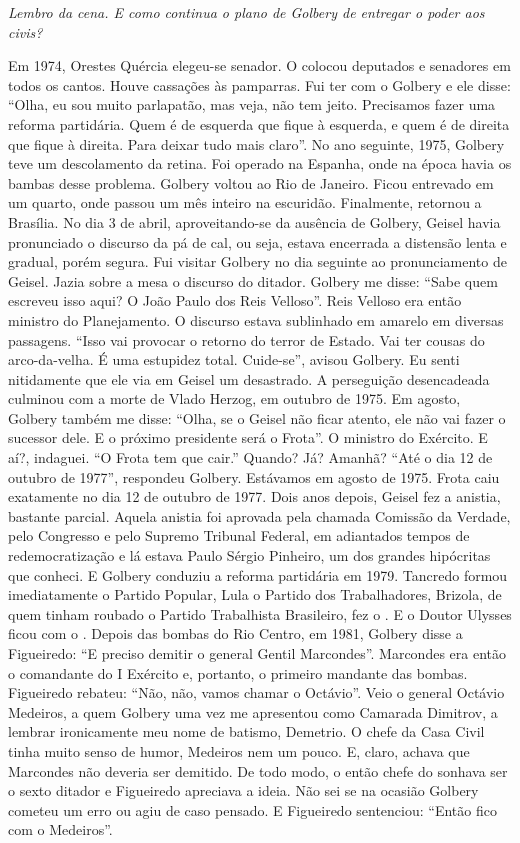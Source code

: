 \itshape
 Lembro da cena. E como continua o plano de Golbery de
entregar o poder aos civis?

\normalfont 
Em 1974, Orestes Quércia elegeu-se senador. O  colocou
deputados e senadores em todos os cantos. Houve cassações às pamparras.
Fui ter com o Golbery e ele disse: ``Olha, eu sou muito parlapatão, mas
veja, não tem jeito. Precisamos fazer uma reforma partidária. Quem é de
esquerda que fique à esquerda, e quem é de direita que fique à direita.
Para deixar tudo mais claro''. No ano seguinte, 1975, Golbery teve um
descolamento da retina. Foi operado na Espanha, onde na época havia os
bambas desse problema. Golbery voltou ao Rio de Janeiro. Ficou entrevado
em um quarto, onde passou um mês inteiro na escuridão. Finalmente,
retornou a Brasília. No dia 3 de abril, aproveitando-se da ausência de
Golbery, Geisel havia pronunciado o discurso da pá de cal, ou seja,
estava encerrada a distensão lenta e gradual, porém segura. Fui visitar
Golbery no dia seguinte ao pronunciamento de Geisel. Jazia sobre a mesa
o discurso do ditador. Golbery me disse: ``Sabe quem escreveu isso aqui?
O João Paulo dos Reis Velloso''. Reis Velloso era então ministro do
Planejamento. O discurso estava sublinhado em amarelo em diversas
passagens. ``Isso vai provocar o retorno do terror de Estado. Vai ter
cousas do arco-da-velha. É uma estupidez total. Cuide-se'', avisou
Golbery. Eu senti nitidamente que ele via em Geisel um desastrado. A
perseguição desencadeada culminou com a morte de Vlado Herzog, em
outubro de 1975. Em agosto, Golbery também me disse: ``Olha, se o Geisel
não ficar atento, ele não vai fazer o sucessor dele. E o próximo
presidente será o Frota''. O ministro do Exército. E aí?, indaguei. ``O
Frota tem que cair.'' Quando? Já? Amanhã? ``Até o dia 12 de outubro de
1977'', respondeu Golbery. Estávamos em agosto de 1975. Frota caiu
exatamente no dia 12 de outubro de 1977. Dois anos depois, Geisel fez a
anistia, bastante parcial. Aquela anistia foi aprovada pela chamada
Comissão da Verdade, pelo Congresso e pelo Supremo Tribunal Federal, em
adiantados tempos de redemocratização e lá estava Paulo Sérgio Pinheiro,
um dos grandes hipócritas que conheci. E Golbery conduziu a reforma
partidária em 1979. Tancredo formou imediatamente o Partido Popular,
Lula o Partido dos Trabalhadores, Brizola, de quem tinham roubado o
Partido Trabalhista Brasileiro, fez o . E o Doutor Ulysses ficou com
o . Depois das bombas do Rio Centro, em 1981, Golbery disse a
Figueiredo: ``E preciso demitir o general Gentil Marcondes''. Marcondes
era então o comandante do I Exército e, portanto, o primeiro mandante
das bombas. Figueiredo rebateu: ``Não, não, vamos chamar o Octávio''.
Veio o general Octávio Medeiros, a quem Golbery uma vez me apresentou
como Camarada Dimitrov, a lembrar ironicamente meu nome de batismo,
Demetrio. O chefe da Casa Civil tinha muito senso de humor, Medeiros nem
um pouco. E, claro, achava que Marcondes não deveria ser demitido. De
todo modo, o então chefe do  sonhava ser o sexto ditador e Figueiredo
apreciava a ideia. Não sei se na ocasião Golbery cometeu um erro ou agiu
de caso pensado. E Figueiredo sentenciou: ``Então fico com o Medeiros''.


